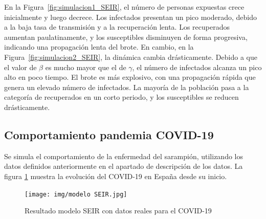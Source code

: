 En la Figura~\ref{fig:simulacion1_SEIR}, el número de personas expuestas crece inicialmente y luego decrece. Los infectados presentan un pico moderado, debido a la baja tasa de transmisión y a la recuperación lenta. Los recuperados aumentan paulatinamente, y los susceptibles disminuyen de forma progresiva, indicando una propagación lenta del brote.
En cambio, en la Figura~\ref{fig:simulacion2_SEIR}, la dinámica cambia drásticamente. Debido a que el valor de $\beta$ es mucho mayor que el de $\gamma$, el número de infectados alcanza un pico alto en poco tiempo. El brote es más explosivo, con una propagación rápida que genera un elevado número de infectados. La mayoría de la población pasa a la categoría de recuperados en un corto periodo, y los susceptibles se reducen drásticamente.




\subsection{Comportamiento pandemia COVID-19}
Se simula el comportamiento de la enfermedad del sarampión, utilizando los datos definidos anteriormente en el apartado de descripción de los datos. La figura \ref{fig:Simucov} muestra la evolución del COVID-19 en España desde su inicio.

\begin{figure}[H]
    \centering
    \texttt{[image: img/modelo SEIR.jpg]}
    \caption{Resultado modelo SEIR con datos reales para el COVID-19}
    \label{fig:Simucov}
    \vspace{0.5cm} %
\end{figure}

